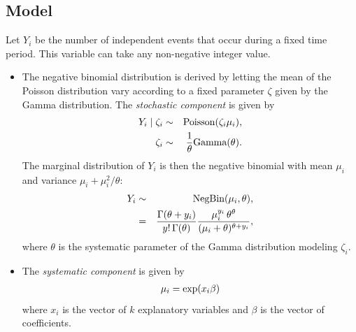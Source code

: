 \documentclass[letterpaper,10pt,english]{sphinxmanual}
\begin{document}
\subsection{Model}
\label{vignette:id27}
Let \(Y_i\) be the number of independent events that occur during a
fixed time period. This variable can take any non-negative integer
value.
\begin{itemize}
\item {} 
The negative binomial distribution is derived by letting the mean of
the Poisson distribution vary according to a fixed parameter
\(\zeta\) given by the Gamma distribution. The \emph{stochastic
component} is given by
\begin{gather}
\begin{split}\begin{aligned}
     Y_i \mid \zeta_i & \sim & \textrm{Poisson}(\zeta_i \mu_i),\\
     \zeta_i & \sim & \frac{1}{\theta}\textrm{Gamma}(\theta).
   \end{aligned}\end{split}\notag
\end{gather}
The marginal distribution of \(Y_i\) is then the negative
binomial with mean \(\mu_i\) and variance
\(\mu_i + \mu_i^2/\theta\):
\begin{gather}
\begin{split}\begin{aligned}
   Y_i & \sim & \textrm{NegBin}(\mu_i, \theta), \\
       & = & \frac{\Gamma (\theta + y_i)}{y! \, \Gamma(\theta)}
             \frac{\mu_i^{y_i} \, \theta^{\theta}}{(\mu_i + \theta)^{\theta + y_i}},
   \end{aligned}\end{split}\notag
\end{gather}
where \(\theta\) is the systematic parameter of the Gamma
distribution modeling \(\zeta_i\).

\item {} 
The \emph{systematic component} is given by
\begin{gather}
\begin{split}\mu_i = \exp(x_i \beta)\end{split}\notag
\end{gather}
where \(x_i\) is the vector of \(k\) explanatory variables
and \(\beta\) is the vector of coefficients.

\end{itemize}
\end{document}
